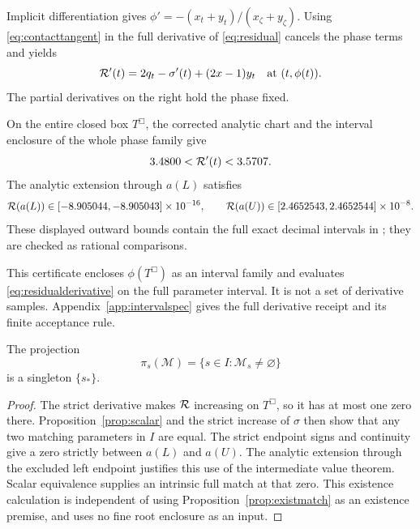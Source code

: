 Implicit differentiation gives
\(\phi'=-(x_t+y_t)/(x_\zeta+y_\zeta)\).
Using \eqref{eq:contacttangent} in the full derivative of
\eqref{eq:residual} cancels the phase terms and yields
\begin{equation}\label{eq:residualderivative}
 \mathcal R'(t)=2q_t-\sigma'(t)+(2x-1)y_t
 \quad\hbox{at }(t,\phi(t)).
\end{equation}
The partial derivatives on the right hold the phase fixed.

\begin{certificate}\label{cert:scalar}
On the entire closed box \(T^\Box\), the corrected analytic chart and
the interval enclosure of the whole phase family give
\[
 3.4800<\mathcal R'(t)<3.5707.
\]
The analytic extension through \(a(L)\) satisfies
\[
 \mathcal R(a(L))\in[-8.905044,-8.905043]\times10^{-16},\qquad
 \mathcal R(a(U))\in[2.4652543,2.4652544]\times10^{-8}.
\]
These displayed outward bounds contain the full exact decimal intervals
in ; they are checked as rational comparisons.
\end{certificate}
This certificate encloses \(\phi(T^\Box)\) as an interval family and
evaluates \eqref{eq:residualderivative} on the full parameter interval.
It is not a set of derivative samples. Appendix~\ref{app:intervalspec}
gives the full derivative receipt and its finite acceptance rule.

\begin{theorem}\label{thm:O6}
The projection
\[
 \pi_s(\mathcal M)=\{s\in I:\mathcal M_s\ne\varnothing\}
\]
is a singleton \(\{s_*\}\).
\end{theorem}
\begin{proof}
The strict derivative makes \(\mathcal R\) increasing on \(T^\Box\), so it
has at most one zero there. Proposition~\ref{prop:scalar} and the
strict increase of \(\sigma\) then show that any two matching parameters
in \(I\) are equal. The strict endpoint signs and continuity give a zero
strictly between \(a(L)\) and \(a(U)\). The analytic extension through
the excluded left endpoint justifies this use of the intermediate value
theorem. Scalar equivalence supplies an intrinsic full match at that
zero. This existence calculation is independent of using
Proposition~\ref{prop:existmatch} as an existence premise, and uses no
fine root enclosure as an input.
\end{proof}
